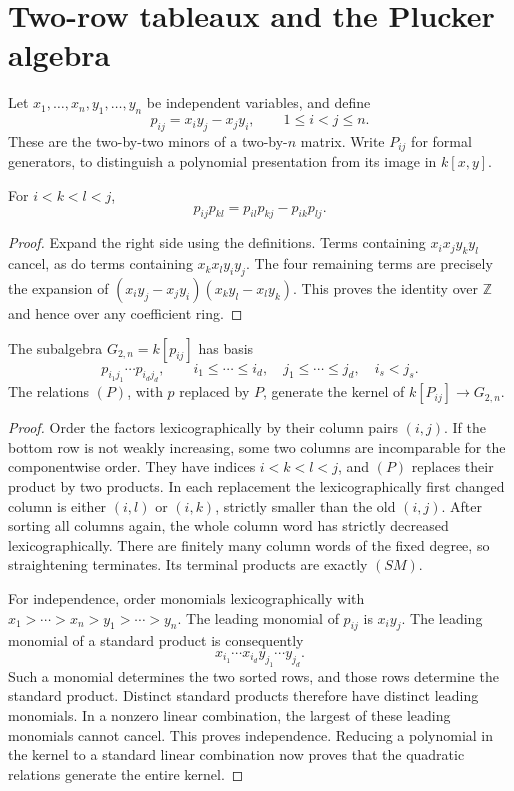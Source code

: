 \section{Two-row tableaux and the Plucker algebra}

Let \(x_1,\ldots,x_n,y_1,\ldots,y_n\) be independent
variables, and define
\[
 p_{ij}=x_i y_j-x_j y_i,\qquad 1\le i<j\le n.
\]
These are the two-by-two minors of a two-by-\(n\) matrix.
Write \(P_{ij}\) for formal generators, to distinguish a
polynomial presentation from its image in \(k[x,y]\).

\begin{lemma}
For \(i<k<l<j\),
\[
 p_{ij}p_{kl}=p_{il}p_{kj}-p_{ik}p_{lj}.
 \tag{P}
\]
\end{lemma}
\begin{proof}
Expand the right side using the definitions.  Terms containing
\(x_ix_j y_k y_l\) cancel, as do terms containing
\(x_kx_l y_i y_j\).  The four remaining terms are precisely
the expansion of
\((x_i y_j-x_j y_i)(x_k y_l-x_l y_k)\).
This proves the identity over \(\mathbb Z\) and hence over
any coefficient ring.
\end{proof}

\begin{theorem}
The subalgebra \(G_{2,n}=k[p_{ij}]\) has basis
\[
 p_{i_1j_1}\cdots p_{i_dj_d},
 \qquad i_1\le\cdots\le i_d,\quad
        j_1\le\cdots\le j_d,\quad i_s<j_s.
 \tag{SM}
\]
The relations \((P)\), with \(p\) replaced by \(P\), generate
the kernel of \(k[P_{ij}]\to G_{2,n}\).
\end{theorem}
\begin{proof}
Order the factors lexicographically by their column pairs
\((i,j)\).  If the bottom row is not weakly increasing,
some two columns are incomparable for the componentwise
order.  They have indices \(i<k<l<j\), and \((P)\) replaces
their product by two products.  In each replacement the
lexicographically first changed column is either \((i,l)\)
or \((i,k)\), strictly smaller than the old \((i,j)\).
After sorting all columns again, the whole column word
has strictly decreased lexicographically.  There are
finitely many column words of the fixed degree, so
straightening terminates.  Its terminal products are
exactly \((SM)\).

For independence, order monomials lexicographically with
\(x_1>\cdots>x_n>y_1>\cdots>y_n\).
The leading monomial of \(p_{ij}\) is \(x_i y_j\).
The leading monomial of a standard product is consequently
\[
 x_{i_1}\cdots x_{i_d}y_{j_1}\cdots y_{j_d}.
\]
Such a monomial determines the two sorted rows, and those
rows determine the standard product.  Distinct standard
products therefore have distinct leading monomials.
In a nonzero linear combination, the largest of these
leading monomials cannot cancel.  This proves independence.
Reducing a polynomial in the kernel to a standard linear
combination now proves that the quadratic relations
generate the entire kernel.
\end{proof}

